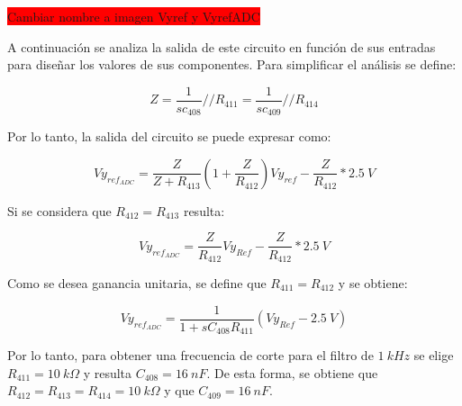 \colorbox{red}{Cambiar nombre a imagen Vyref y VyrefADC}
%
%  
%  
 
A continuación se analiza la salida de este circuito en función de sus entradas para diseñar los valores de sus componentes. Para simplificar el análisis se define:

\begin{equation*} 
	Z=\frac{1}{sc_{408}}//R_{411}=\frac{1}{sc_{409}}//R_{414}
\end{equation*}

Por lo tanto, la salida del circuito se puede expresar como:

\begin{equation*} 
	Vy_{ref_{ADC}}=\frac{Z}{Z+R_{413}}(1+\frac{Z}{R_{412}})Vy_{ref}-\frac{Z}{R_{412}}*2.5\:V
\end{equation*}

Si se considera que $R_{412}=R_{413}$ resulta:

\begin{equation*} 
	Vy_{ref_{ADC}}=\frac{Z}{R_{412}}Vy_{Ref}-\frac{Z}{R_{412}}*2.5\:V
\end{equation*}


Como se desea ganancia unitaria, se define que $R_{411}=R_{412}$ y se obtiene:

\begin{equation*} 
	Vy_{ref_{ADC}}=\frac{1}{1+sC_{408}R_{411}}(Vy_{Ref}-2.5\:V)
\end{equation*}


Por lo tanto, para obtener una frecuencia de corte para el filtro de $1\:kHz$ se elige $R_{411}=10\:k\Omega$ y resulta $C_{408}=16\:nF$. De esta forma, se obtiene que $R_{412}=R_{413}=R_{414}=10\:k\Omega$ y que $C_{409}=16\:nF$.


